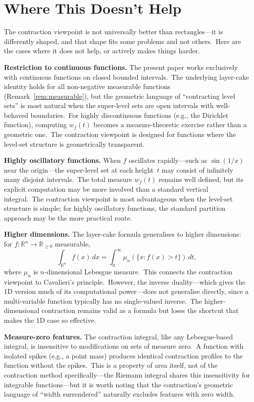 \documentclass[11pt,a4paper]{article}
\begin{document}
\section{Where This Doesn't Help}

The contraction viewpoint is not universally better than rectangles---it is differently shaped, and that shape fits some problems and not others.\ Here are the cases where it does not help, or actively makes things harder.

\medskip
\noindent\textbf{Restriction to continuous functions.}\quad
The present paper works exclusively with continuous functions on closed bounded intervals.\ The underlying layer-cake identity holds for all non-negative measurable functions (Remark~\ref{rem:measurable}), but the geometric language of ``contracting level sets'' is most natural when the super-level sets are open intervals with well-behaved boundaries.\ For highly discontinuous functions (e.g., the Dirichlet function), computing $w_f(t)$ becomes a measure-theoretic exercise rather than a geometric one.\ The contraction viewpoint is designed for functions where the level-set structure is geometrically transparent.

\medskip
\noindent\textbf{Highly oscillatory functions.}\quad
When $f$ oscillates rapidly---such as $\sin(1/x)$ near the origin---the super-level set at each height~$t$ may consist of infinitely many disjoint intervals.\ The total measure $w_f(t)$ remains well defined, but its explicit computation may be more involved than a standard vertical integral.\ The contraction viewpoint is most advantageous when the level-set structure is simple; for highly oscillatory functions, the standard partition approach may be the more practical route.

\medskip
\noindent\textbf{Higher dimensions.}\quad
The layer-cake formula generalises to higher dimensions: for $f:\mathbb{R}^n\to\mathbb{R}_{\geq 0}$ measurable,
\[
\int_{\mathbb{R}^n}f(x)\,dx = \int_0^{\infty}\mu_n(\{x:f(x)>t\})\,dt,
\]
where $\mu_n$ is $n$-dimensional Lebesgue measure.\ This connects the contraction viewpoint to Cavalieri's principle.\ However, the inverse duality---which gives the 1D version much of its computational power---does not generalise directly, since a multi-variable function typically has no single-valued inverse.\ The higher-dimensional contraction remains valid as a formula but loses the shortcut that makes the 1D case so effective.

\medskip
\noindent\textbf{Measure-zero features.}\quad
The contraction integral, like any Lebesgue-based integral, is insensitive to modifications on sets of measure zero.\ A function with isolated spikes (e.g., a point mass) produces identical contraction profiles to the function without the spikes.\ This is a property of area itself, not of the contraction method specifically---the Riemann integral shares this insensitivity for integrable functions---but it is worth noting that the contraction's geometric language of ``width surrendered'' naturally excludes features with zero width.
\end{document}
